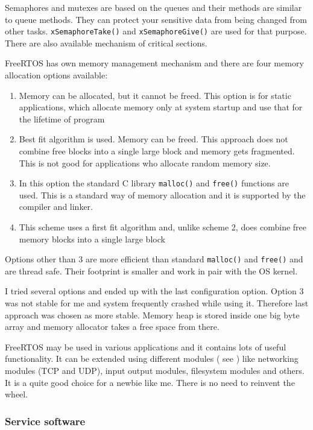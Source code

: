Semaphores and mutexes are based on the queues and their methods are similar to
queue methods.
They can protect your sensitive data from being changed from other tasks.
\texttt{xSemaphoreTake()} and \texttt{xSemaphoreGive()} are used for that
purpose. There are also available mechanism of critical sections.

FreeRTOS has own memory management mechanism and there are four memory
allocation  options available:
\begin{enumerate}
  \item Memory can be allocated, but it cannot be freed. This option is for
  static applications, which allocate memory only at system startup and use that for
  the lifetime of program 
  \item  Best fit algorithm is used. Memory can be freed. This approach does not
  combine free blocks into a single large block and memory gets fragmented. This
  is not good for applications who allocate random memory size.
  \item  In this option the standard C library \texttt{malloc()} and
  \texttt{free()} functions are used. This is a standard way of memory
  allocation and it is supported by the compiler and linker.
  \item This scheme uses a first fit algorithm and, unlike scheme 2, does
  combine free memory blocks into a single large block
\end{enumerate}

Options other than 3 are more efficient than standard \texttt{malloc()}
and \texttt{free()} and are thread safe. Their footprint is smaller and work in
pair with the OS kernel. 

I tried several options and ended up with the last configuration option. 
Option 3 was not stable for me and system frequently crashed while using it.
Therefore last approach was chosen as more stable. Memory heap is stored inside
one big byte array and memory allocator takes a free space from there.

FreeRTOS may be used in various applications and it contains lots of useful
functionality. It can be extended using different modules ( see
\cite{FreeRTOS_website}) like networking modules (TCP and UDP), input output
modules, filesystem modules and others. It is a quite good choice for a newbie
like me. There is no need to reinvent the wheel.

\subsubsection{Service software}


